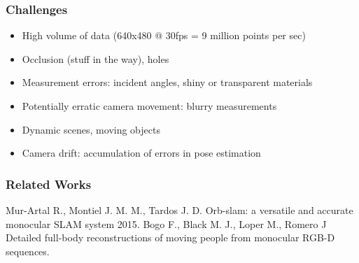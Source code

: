 \begin{frame}
\frametitle{Challenges}
\begin{itemize}
  \item High volume of data (640x480 @ 30fps = 9 million points per sec)
  \item Occlusion (stuff in the way), holes
  \item Measurement errors: incident angles, shiny or transparent materials
  \item Potentially erratic camera movement: blurry measurements
  \item Dynamic scenes, moving objects
  \item Camera drift: accumulation of errors in pose estimation
\end{itemize}
\end{frame}

\begin{frame}[allowframebreaks]
  \frametitle<presentation>{Related Works}
  \begin{thebibliography}{1}
  \beamertemplatearticlebibitems
    \newblock Mur-Artal R., Montiel J. M. M., Tardos J. D.
    \newblock Orb-slam: a versatile and accurate monocular SLAM system 2015.
    \newblock Bogo F., Black M. J., Loper M., Romero J
    \newblock Detailed full-body reconstructions of moving people from monocular RGB-D sequences.
  \end{thebibliography}
\end{frame}
